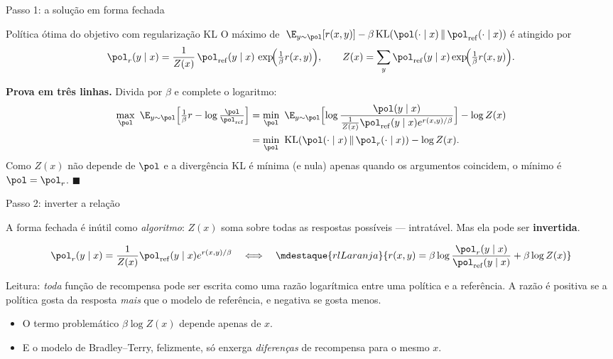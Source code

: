 \documentclass[aspectratio=169, 11pt]{beamer}
\newcommand{\pref}{\pol_{\mathrm{ref}}}          %
\newcommand{\KLd}[2]{\mathrm{KL}\!\left(#1 \,\middle\|\, #2\right)}
\begin{document}
\begin{frame}{Passo 1: a solução em forma fechada}

  \begin{teobox}{Política ótima do objetivo com regularização KL}
    O máximo de
    $\;\E_{y\sim\pol}[r(x,y)] - \beta\,\KLd{\pol(\cdot\mid x)}{\pref(\cdot\mid x)}$
    é atingido por
    \[
      \pol_{r}(y\mid x) = \frac{1}{Z(x)}\,\pref(y\mid x)\,
        \exp\!\Bigl(\tfrac{1}{\beta} r(x,y)\Bigr),
      \qquad
      Z(x) = \sum_{y}\pref(y\mid x)\exp\!\Bigl(\tfrac{1}{\beta} r(x,y)\Bigr).
    \]
  \end{teobox}

  \pause
  \textbf{Prova em três linhas.} Divida por $\beta$ e complete o logaritmo:
  \begin{align*}
    \max_{\pol}\ \E_{y\sim\pol}\Bigl[\tfrac{1}{\beta}r - \log\tfrac{\pol}{\pref}\Bigr]
    &= \min_{\pol}\ \E_{y\sim\pol}\Bigl[\log\frac{\pol(y\mid x)}
        {\tfrac{1}{Z(x)}\pref(y\mid x)e^{r(x,y)/\beta}}\Bigr] - \log Z(x)\\
    &= \min_{\pol}\ \KLd{\pol(\cdot\mid x)}{\pol_r(\cdot\mid x)} - \log Z(x).
  \end{align*}
  Como $Z(x)$ não depende de $\pol$ e a divergência KL é mínima (e nula) apenas
  quando os argumentos coincidem, o mínimo é $\pol = \pol_r$. \hfill$\blacksquare$
\end{frame}

\begin{frame}{Passo 2: inverter a relação}

  A forma fechada é inútil como \emph{algoritmo}: $Z(x)$ soma sobre todas as
  respostas possíveis --- intratável. Mas ela pode ser \textbf{invertida}.

  \[
    \pol_{r}(y\mid x) = \frac{1}{Z(x)}\pref(y\mid x) e^{r(x,y)/\beta}
    \quad\Longleftrightarrow\quad
    \mdestaque{rlLaranja}{r(x,y) = \beta \log \frac{\pol_{r}(y\mid x)}{\pref(y\mid x)}
      + \beta\log Z(x)}
  \]

  \begin{ideiabox}
    Leitura: \emph{toda} função de recompensa pode ser escrita como uma razão
    logarítmica entre uma política e a referência. A razão é positiva se a
    política gosta da resposta \emph{mais} que o modelo de referência, e negativa
    se gosta menos.
  \end{ideiabox}

  \begin{itemize}\setlength{\itemsep}{0.25ex}
    \item O termo problemático $\beta\log Z(x)$ depende apenas de $x$.
    \item E o modelo de Bradley--Terry, felizmente, só enxerga \emph{diferenças}
      de recompensa para o mesmo $x$.
  \end{itemize}
\end{frame}
\end{document}
